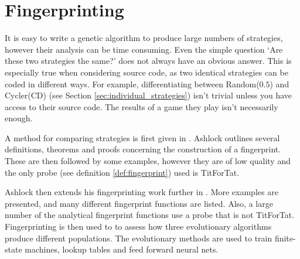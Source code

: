 
\section{Fingerprinting}\label{sec:fingerprinting}
It is easy to write a genetic algorithm to produce large numbers of strategies, however their analysis can be time consuming.
Even the simple question `Are these two strategies the same?' does not always have an obvious answer.
This is especially true when considering source code, as two identical strategies can be coded in different ways.
For example, differentiating between Random($0.5$) and Cycler(CD) (see Section \ref{sec:individual_strategies}) isn't trivial unless you have access to their source code.
The results of a game they play isn't necessarily enough.

A method for comparing strategies is first given in \cite{Ashlock2004}.
Ashlock outlines several definitions, theorems and proofs concerning the construction of a fingerprint.
These are then followed by some examples, however they are of low quality and the only probe (see definition \ref{def:fingerprint}) used is TitForTat.

Ashlock then extends his fingerprinting work further in \cite{Ashlock2008}.
More examples are presented, and many different fingerprint functions are listed.
Also, a large number of the analytical fingerprint functions use a probe that is not TitForTat.
Fingerprinting is then used to to assess how three evolutionary algorithms produce different populations.
The evolutionary methods are used to train finite-state machines, lookup tables and feed forward neural nets.

